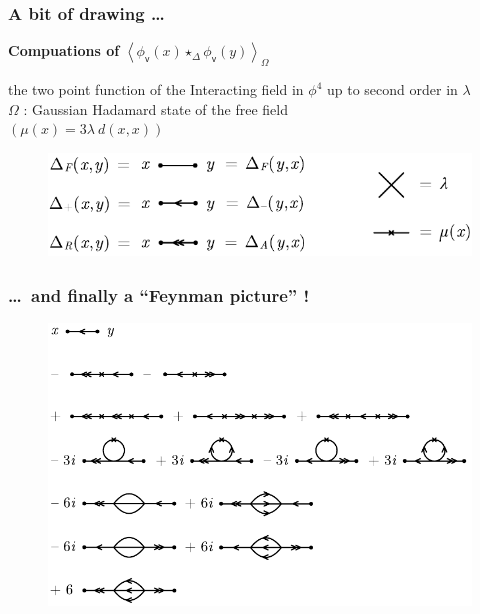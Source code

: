 \documentclass[9pt]{beamer}
\newcommand{\Smearip}[1]{\left\langle #1 \right\rangle} %
\newcommand{\vsf}{\mathsf{v}}
\begin{document}
\begin{frame}
 
\frametitle{A bit of drawing \dots }

\vfill

\textbf{Compuations of} $\Smearip{\phi_\vsf(x) \star_\Delta \phi_\vsf(y)}_\Omega$ \\

\vfill

the two point function of the Interacting field in $\phi^4$ up to second order in $\lambda$ \\[3pt]
$\Omega$ : Gaussian Hadamard state of the free field \\[3pt]
$(\mu(x) = 3 \lambda \ d(x, x))$

\vfill

\begin{figure}[h!]
 \centering
 \includegraphics[scale=0.7]{./fig_propagators.pdf}
\end{figure}

\vfill

\end{frame}


\begin{frame}
 
\frametitle{ \dots \ and finally a ``Feynman picture'' ! }

\vfill

\begin{figure}[h!]
 \centering
 \includegraphics[scale=0.7]{./fig_2pf.pdf}
\end{figure}

\vfill

\end{frame}
\end{document}

